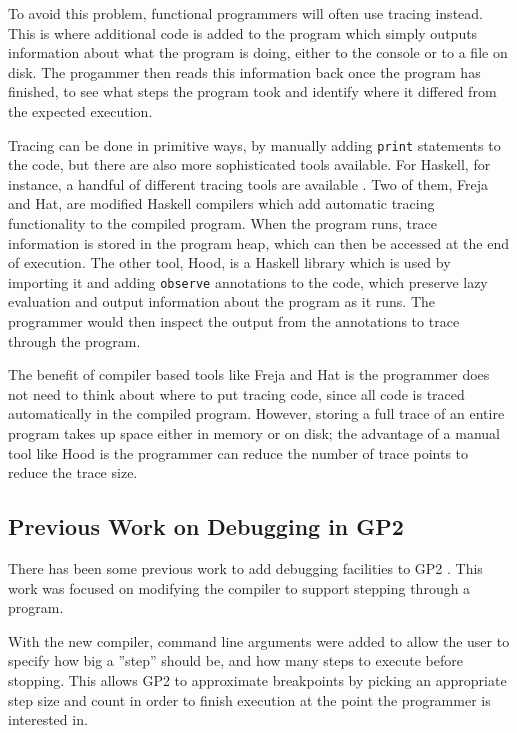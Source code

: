 \documentclass[authoryearcitations]{UoYCSproject}
\begin{document}
To avoid this problem, functional programmers will often use tracing instead.
This is where additional code is added to the program which simply outputs
information about what the program is doing, either to the console or to a file on
disk. The progammer then reads this information back once the program has finished,
to see what steps the program took and identify where it differed from the
expected execution.

Tracing can be done in primitive ways, by manually adding \texttt{print}
statements to the code, but there are also more sophisticated tools available.
For Haskell, for instance, a handful of different tracing tools are
available \citep{runciman2000}. Two of them, Freja and Hat, are modified Haskell
compilers which add automatic tracing functionality to the compiled program. When
the program runs, trace information is stored in the program heap, which can then
be accessed at the end of execution. The other tool, Hood, is a Haskell library
which is used by importing it and adding \texttt{observe} annotations to the code,
which preserve lazy evaluation and output information about the program as it runs.
The programmer would then inspect the output from the annotations to trace through
the program.

The benefit of compiler based tools like Freja and Hat is the programmer does not
need to think about where to put tracing code, since all code is traced automatically
in the compiled program. However, storing a full trace of an entire program takes
up space either in memory or on disk; the advantage of a manual tool like Hood is
the programmer can reduce the number of trace points to reduce the trace size.


\subsection{Previous Work on Debugging in GP2}
\label{sec:PreviousWorkOnDebuggingInGP2}

There has been some previous work to add debugging facilities to GP2 \citep{taylor2016}.
This work was focused on modifying the compiler to support stepping through a
program.

With the new compiler, command line arguments were added to allow the user to
specify how big a ''step'' should be, and how many steps to execute before stopping.
This allows GP2 to approximate breakpoints by picking an appropriate step size
and count in order to finish execution at the point the programmer is interested in.
\end{document}
